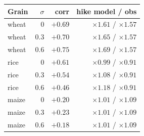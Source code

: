 \begin{tabular}{l r rr}
\toprule
Grain & \(\sigma\) & corr & hike model / obs \\
\midrule
wheat & 0   & $+0.69$ & $\times 1.61$ / $\times 1.57$ \\
wheat & 0.3 & $+0.70$ & $\times 1.65$ / $\times 1.57$ \\
wheat & 0.6 & $+0.75$ & $\times 1.69$ / $\times 1.57$ \\
rice  & 0   & $+0.61$ & $\times 0.99$ / $\times 0.91$ \\
rice  & 0.3 & $+0.54$ & $\times 1.08$ / $\times 0.91$ \\
rice  & 0.6 & $+0.46$ & $\times 1.18$ / $\times 0.91$ \\
maize & 0   & $+0.20$ & $\times 1.01$ / $\times 1.09$ \\
maize & 0.3 & $+0.23$ & $\times 1.01$ / $\times 1.09$ \\
maize & 0.6 & $+0.18$ & $\times 1.01$ / $\times 1.09$ \\
\bottomrule
\end{tabular}
